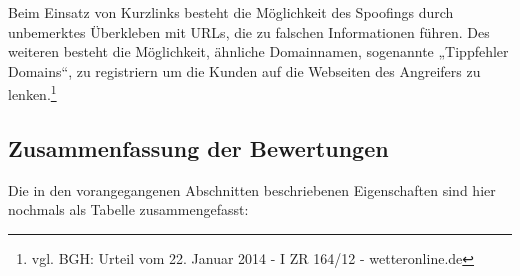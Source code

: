 Beim Einsatz von Kurzlinks besteht die Möglichkeit des Spoofings durch unbemerktes Überkleben mit \ac{URL}s, die zu falschen Informationen führen. Des weiteren besteht die Möglichkeit, ähnliche Domainnamen, sogenannte „Tippfehler Domains“, zu registriern um die Kunden auf die Webseiten des Angreifers zu lenken.\footnote{vgl. BGH: Urteil vom 22. Januar 2014 - I ZR 164/12 - wetteronline.de}

\subsection{Zusammenfassung der Bewertungen} %
\label{sub:zusammenfassung_der_bewertungen}

Die in den vorangegangenen Abschnitten beschriebenen Eigenschaften sind hier nochmals als Tabelle zusammengefasst:

